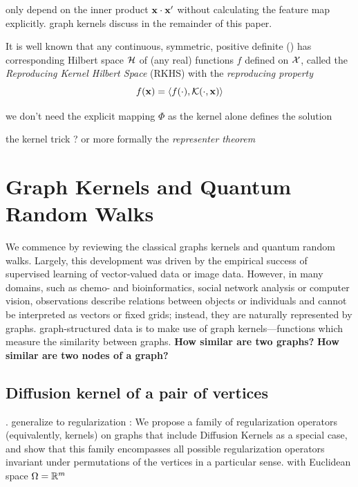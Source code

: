 only depend on the inner product $\vb{x}\cdot\vb{x}'$ without calculating the feature map explicitly. 
graph kernels discuss in the remainder of this paper.

\begin{definition}\label{def:rkhs}
	It is well known that any continuous, symmetric, positive definite () has corresponding Hilbert space $\mathcal{H}$ of (any real) functions $f$ defined on $\mathcal{X}$, 
	called the \emph{Reproducing Kernel Hilbert Space} (RKHS) with the \emph{reproducing property}
	\begin{equation}
		f(\vb{x}) = \expval{f(\cdot),\mathcal{K}(\cdot,\vb{x})}
	\end{equation}
\end{definition}
we don't need the explicit mapping $\Phi$ as the kernel alone defines the solution 
\begin{theorem}
	the kernel trick ? or more formally the \emph{representer theorem}
	\cite{chatterjeeGeneralizedCoherentStates2017}
\end{theorem}

\section{Graph Kernels and Quantum Random Walks}
We commence by reviewing the classical graphs kernels and quantum random walks.
Largely, this development was driven by the empirical success of supervised learning of vector-valued data or image data. However, in many domains, such as chemo- and bioinformatics, social network analysis or computer vision, observations describe relations between objects or individuals and cannot be interpreted as vectors or fixed grids; instead, they are naturally represented by graphs.
\cite{kriegeSurveyGraphKernels2020}
graph-structured data is to make use of graph kernels—functions which measure the similarity between graphs.
\textbf{How similar are two graphs?}
\textbf{How similar are two nodes of a graph?}

\subsection{Diffusion kernel of a pair of vertices}
\cite{kondorDiffusionKernelsGraphs2002}.
generalize to regularization \cite{kondorGraphletSpectrum2009}: 
We propose a family of regularization operators (equivalently, kernels) on graphs that include Diffusion Kernels as a special case, and show that this family encompasses all possible regularization operators invariant under permutations of the vertices in a particular sense.
\cite{smolaKernelsRegularizationGraphs2003}
with Euclidean space $\Omega = \mathbb{R}^m$

